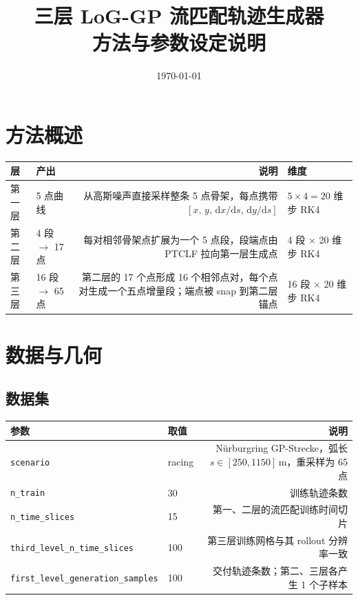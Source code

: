 \documentclass[11pt,a4paper]{ctexart}
\title{\textbf{三层 LoG-GP 流匹配轨迹生成器\\方法与参数设定说明}}
\author{}
\date{\today}
\newcommand{\cf}[1]{\texttt{\small #1}}
\begin{document}
\section{方法概述}


\begin{center}
\small
\begin{tabularx}{\textwidth}{@{}p{2.4cm}p{3.5cm}Rp{3.2cm}@{}}
\toprule
\textbf{层} & \textbf{产出} & \textbf{说明} & \textbf{维度} \\
\midrule
第一层\newline & 5 点曲线 &
从高斯噪声直接采样整条 5 点骨架，每点携带 $[x,\,y,\,\mathrm{d}x/\mathrm{d}s,\,\mathrm{d}y/\mathrm{d}s]$ &
$5\times4=20$ 维 步 RK4 \\
\addlinespace
第二层\newline  & 4 段 $\rightarrow$ 17 点 &
每对相邻骨架点扩展为一个 5 点段，段端点由 PTCLF 拉向第一层生成点 &
4 段 $\times$ 20 维 步 RK4 \\
\addlinespace
第三层\newline  & 16 段 $\rightarrow$ 65 点 &
第二层的 17 个点形成 16 个相邻点对，每个点对生成一个五点增量段；端点被 snap 到第二层锚点 &
16 段 $\times$ 20 维 步 RK4 \\
\bottomrule
\end{tabularx}
\end{center}

\section{数据与几何}

\subsection{数据集}
\begin{center}
\small
\begin{tabularx}{\textwidth}{@{}p{5.2cm}p{1.8cm}R@{}}
\toprule
\textbf{参数} & \textbf{取值} & \textbf{说明} \\
\midrule
\cf{scenario} & racing & Nürburgring GP-Strecke，弧长 $s\in[250,1150]$\,m，重采样为 65 点 \\
\cf{n\_train} & 30 & 训练轨迹条数 \\
\cf{n\_time\_slices} & 15 & 第一、二层的流匹配训练时间切片 \\
\cf{third\_level\_n\_time\_slices} & 100 & 第三层训练网格与其 rollout 分辨率一致 \\
\cf{first\_level\_generation\_samples} & 100 & 交付轨迹条数；第二、三层各产生 1 个子样本 \\
\bottomrule
\end{tabularx}
\end{center}
\end{document}
